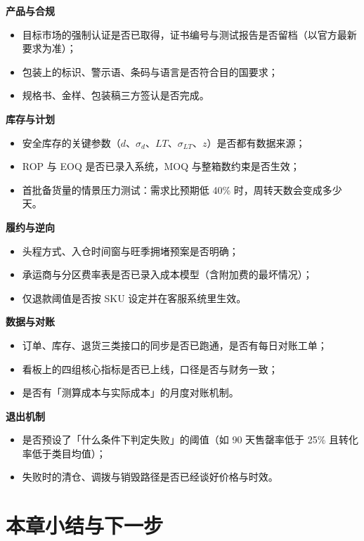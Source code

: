 \begin{toolbox}
\textbf{产品与合规}
\begin{itemize}
  \item 目标市场的强制认证是否已取得，证书编号与测试报告是否留档（以官方最新要求为准）；
  \item 包装上的标识、警示语、条码与语言是否符合目的国要求；
  \item 规格书、金样、包装稿三方签认是否完成。
\end{itemize}
\textbf{库存与计划}
\begin{itemize}
  \item 安全库存的关键参数（$d$、$\sigma_d$、$LT$、$\sigma_{LT}$、$z$）是否都有数据来源；
  \item ROP 与 EOQ 是否已录入系统，MOQ 与整箱数约束是否生效；
  \item 首批备货量的情景压力测试：需求比预期低 40\% 时，周转天数会变成多少天。
\end{itemize}
\textbf{履约与逆向}
\begin{itemize}
  \item 头程方式、入仓时间窗与旺季拥堵预案是否明确；
  \item 承运商与分区费率表是否已录入成本模型（含附加费的最坏情况）；
  \item 仅退款阈值是否按 SKU 设定并在客服系统里生效。
\end{itemize}
\textbf{数据与对账}
\begin{itemize}
  \item 订单、库存、退货三类接口的同步是否已跑通，是否有每日对账工单；
  \item 看板上的四组核心指标是否已上线，口径是否与财务一致；
  \item 是否有「测算成本与实际成本」的月度对账机制。
\end{itemize}
\textbf{退出机制}
\begin{itemize}
  \item 是否预设了「什么条件下判定失败」的阈值（如 90 天售罄率低于 25\% 且转化率低于类目均值）；
  \item 失败时的清仓、调拨与销毁路径是否已经谈好价格与时效。
\end{itemize}
\end{toolbox}

\section{本章小结与下一步}

